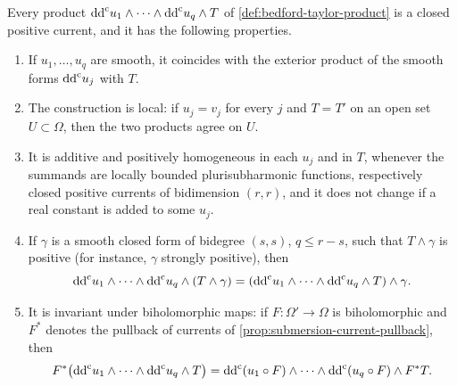 \begin{proposition}\label{prop:bt-positive-recursion}
Every product $\mathrm{dd}^{\mathrm{c}} u_1\wedge\cdots\wedge\mathrm{dd}^{\mathrm{c}} u_q\wedge T$ of \cref{def:bedford-taylor-product} is a closed positive current, and it has the following properties.
\begin{enumerate}
\item If $u_1,\ldots,u_q$ are smooth, it coincides with the exterior product of the smooth forms $\mathrm{dd}^{\mathrm{c}} u_j$ with $T$.
\item The construction is local: if $u_j=v_j$ for every $j$ and $T=T'$ on an open set $U\subset\Omega$, then the two products agree on $U$.
\item It is additive and positively homogeneous in each $u_j$ and in $T$, whenever the summands are locally bounded plurisubharmonic functions, respectively closed positive currents of bidimension $(r,r)$, and it does not change if a real constant is added to some $u_j$.
\item If $\gamma$ is a smooth closed form of bidegree $(s,s)$, $q\le r-s$, such that $T\wedge\gamma$ is positive (for instance, $\gamma$ strongly positive), then
\[
 \mathrm{dd}^{\mathrm{c}} u_1\wedge\cdots\wedge\mathrm{dd}^{\mathrm{c}} u_q\wedge(T\wedge\gamma)=(\mathrm{dd}^{\mathrm{c}} u_1\wedge\cdots\wedge\mathrm{dd}^{\mathrm{c}} u_q\wedge T)\wedge\gamma.
\]
\item It is invariant under biholomorphic maps: if $F\colon\Omega'\to\Omega$ is biholomorphic and $F^*$ denotes the pullback of currents of \cref{prop:submersion-current-pullback}, then
\[
 F^*\bigl(\mathrm{dd}^{\mathrm{c}} u_1\wedge\cdots\wedge\mathrm{dd}^{\mathrm{c}} u_q\wedge T\bigr)=\mathrm{dd}^{\mathrm{c}}(u_1\circ F)\wedge\cdots\wedge\mathrm{dd}^{\mathrm{c}}(u_q\circ F)\wedge F^*T.
\]
\end{enumerate}
\end{proposition}
